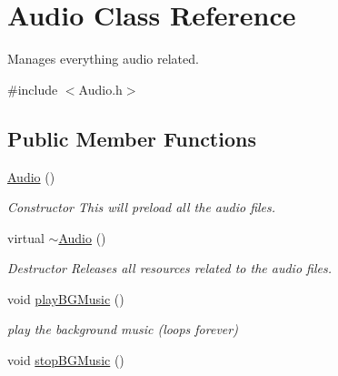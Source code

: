 \hypertarget{classAudio}{
\section{Audio Class Reference}
\label{classAudio}
}


Manages everything audio related.  




{\ttfamily \#include $<$Audio.h$>$}

\subsection*{Public Member Functions}
\begin{DoxyCompactItemize}
\item 
\hypertarget{classAudio_aa9d3935a2b91ab4b825bc0cb05f245ea}{
\hyperlink{classAudio_aa9d3935a2b91ab4b825bc0cb05f245ea}{Audio} ()}
\label{classAudio_aa9d3935a2b91ab4b825bc0cb05f245ea}

\begin{DoxyCompactList}\small\item\em Constructor This will preload all the audio files. \item\end{DoxyCompactList}\item 
\hypertarget{classAudio_ae8f54deecb5f48511aaab469e80294d6}{
virtual \hyperlink{classAudio_ae8f54deecb5f48511aaab469e80294d6}{$\sim$Audio} ()}
\label{classAudio_ae8f54deecb5f48511aaab469e80294d6}

\begin{DoxyCompactList}\small\item\em Destructor Releases all resources related to the audio files. \item\end{DoxyCompactList}\item 
\hypertarget{classAudio_abafc657b2fa6b6b622c87ecf7a3acf39}{
void \hyperlink{classAudio_abafc657b2fa6b6b622c87ecf7a3acf39}{playBGMusic} ()}
\label{classAudio_abafc657b2fa6b6b622c87ecf7a3acf39}

\begin{DoxyCompactList}\small\item\em play the background music (loops forever) \item\end{DoxyCompactList}\item 
\hypertarget{classAudio_a01f3b6aac2b88e2bb2640ce70627b674}{
void \hyperlink{classAudio_a01f3b6aac2b88e2bb2640ce70627b674}{stopBGMusic} ()}
\label{classAudio_a01f3b6aac2b88e2bb2640ce70627b674}


\end{DoxyCompactItemize}
